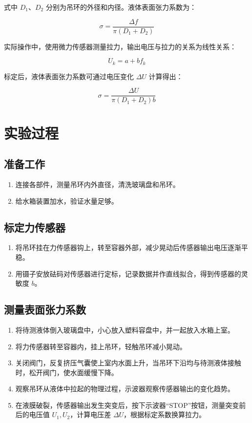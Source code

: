 \documentclass[UTF8]{ctexart}
\begin{document}
式中 \(D_1\)、\(D_2\) 分别为吊环的外径和内径。液体表面张力系数为：

\begin{equation}
\sigma = \frac{\Delta f}{\pi (D_1 + D_2)}
\end{equation}

实际操作中，使用微力传感器测量拉力，输出电压与拉力的关系为线性关系：

\begin{equation}
U_k = a + b f_k
\end{equation}

标定后，液体表面张力系数可通过电压变化 \(\Delta U\) 计算得出：

\begin{equation}
\sigma = \frac{\Delta U}{\pi (D_1 + D_2) b}
\end{equation}

\section{实验过程}

\subsection{准备工作}

\begin{enumerate}
    \item 连接各部件，测量吊环内外直径，清洗玻璃盘和吊环。
    \item 给水箱装置加水，验证水量足够。
\end{enumerate}

\subsection{标定力传感器}

\begin{enumerate}
    \item 将吊环挂在力传感器钩上，转至容器外部，减少晃动后传感器输出电压逐渐平稳。
    \item 用镊子安放砝码对传感器进行定标，记录数据并作直线拟合，得到传感器的灵敏度 \(b\)。
\end{enumerate}

\subsection{测量表面张力系数}

\begin{enumerate}
    \item 将待测液体倒入玻璃盘中，小心放入塑料容盘中，并一起放入水箱上室。
    \item 将力传感器转至容器内，挂上吊环，轻触吊环减小晃动。
    \item 关闭阀门，反复挤压气囊使上室内水面上升，当吊环下沿均与待测液体接触时，松开阀门，使水面缓慢下降。
    \item 观察吊环从液体中拉起的物理过程，示波器观察传感器输出的变化趋势。
    \item 在液膜破裂，传感器输出发生突变后，按下示波器“STOP”按钮，测量突变前后的电压值 \(U_1, U_2\)，计算电压差 \(\Delta U\)，根据标定系数换算拉力。
\end{enumerate}
\end{document}
